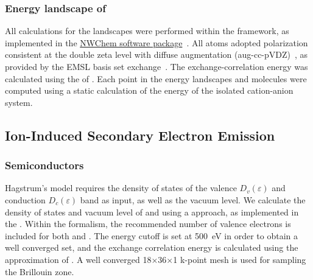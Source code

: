 \begin{refsection}
 \label{appendix:sec-landscape}
\subsubsection{Energy landscape of \ce{[CB11H12]^{-}}}

All calculations for the landscapes were performed within the  framework, as implemented in the \href{http://www.nwchem-sw.org/index.php/Main_Page}{NWChem software package}~\cite{Valiev2010}. All atoms adopted polarization consistent  at the double zeta level with diffuse augmentation (aug-cc-pVDZ)~\cite{Dunning1989, Kendall1992, Prascher2010}, as provided by the EMSL basis set exchange~\cite{Feller1996, Schuchardt2007}. The exchange-correlation energy was calculated using the  of . Each point in the energy landscapes  and  molecules were computed using a static calculation of the energy of the isolated cation-anion system.

\subsection{Ion-Induced Secondary Electron Emission} \label{appendix:sec-quotas} 
 
\subsubsection{Semiconductors} \label{appendix:sec-semiconductors} 

Hagstrum's model requires the density of states of the valence 
$D_v(\varepsilon)$ and conduction $D_c(\varepsilon)$ band as input, as well as 
the vacuum level. We calculate the density of states and vacuum level of 
 and  using a  approach, as implemented in 
the . Within the  formalism, the recommended number of 
valence electrons is included for both  and . The energy cutoff 
is set at 500~\si{\electronvolt} in order to obtain a well converged 
 set, and the exchange correlation energy is calculated 
using the  approximation of . A well converged 
18$\times$36$\times$1  k-point mesh is used for sampling the 
Brillouin zone.
  

\end{refsection}
